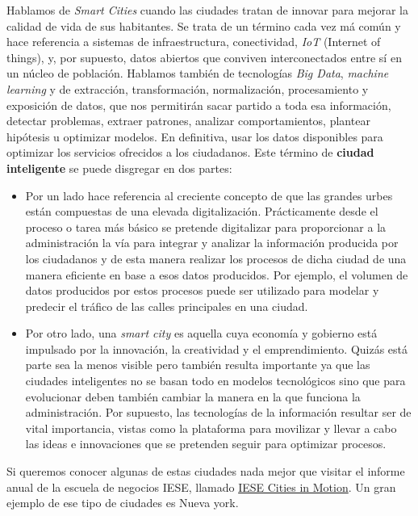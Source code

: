 Hablamos de \textit{Smart Cities} cuando las ciudades tratan de innovar para mejorar la calidad de vida de sus habitantes. Se trata de un término cada vez má común y hace referencia a sistemas de infraestructura, conectividad, \emph{IoT} (Internet of things), y, por supuesto, datos abiertos que conviven interconectados entre sí en un núcleo de población. Hablamos también de tecnologías\textit{ Big Data}, \textit{machine learning} y de extracción, transformación, normalización, procesamiento y exposición de datos, que nos permitirán sacar partido a toda esa información, detectar problemas, extraer patrones, analizar comportamientos, plantear hipótesis u optimizar modelos. En definitiva, usar los datos disponibles para optimizar los servicios ofrecidos a los ciudadanos. Este término de \textbf{ciudad inteligente} se puede disgregar en dos partes:

\begin{itemize}
	\item Por un lado hace referencia al creciente concepto de que las grandes urbes están compuestas de una elevada digitalización. Prácticamente desde el proceso o tarea más básico se pretende digitalizar para proporcionar a la administración la vía para integrar y analizar la información producida por los ciudadanos y de esta manera realizar los procesos de dicha ciudad de una manera eficiente en base a esos datos producidos. Por ejemplo, el volumen de datos producidos por estos procesos puede ser utilizado para modelar y predecir el tráfico de las calles principales en una ciudad.
	\item Por otro lado, una \textit{smart city} es aquella cuya economía y gobierno está impulsado por la innovación, la creatividad y el emprendimiento. Quizás está parte sea la menos visible pero también resulta importante ya que las ciudades inteligentes no se basan todo en modelos tecnológicos sino que para evolucionar deben también cambiar la manera en la que funciona la administración. Por supuesto, las tecnologías de la información resultar ser de vital importancia, vistas como la plataforma para movilizar y llevar a cabo las ideas e innovaciones que se pretenden seguir para optimizar procesos.
\end{itemize}

Si queremos conocer algunas de estas ciudades nada mejor que visitar el informe anual de la escuela de negocios IESE, llamado \href{https://citiesinmotion.iese.edu/indicecim/}{IESE Cities in Motion}. Un gran ejemplo de ese tipo de ciudades es Nueva york.

